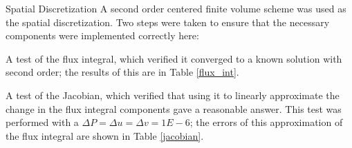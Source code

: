 \documentclass{article}
\begin{document}
\begin{section}{Spatial Discretization}
A second order centered finite volume scheme was used as the spatial discretization.
Two steps were taken to ensure that the necessary components were implemented correctly here:
\begin{itemize}
{\item
  A test of the flux integral, which verified it converged to a known solution with second order;
  the results of this are in Table \ref{flux_int}.
}
{\item
  A test of the Jacobian, which verified that using it to linearly approximate the change in the
  flux integral components gave a reasonable answer.
  This test was performed with a $\Delta P = \Delta u = \Delta v = 1E-6$;
  the errors of this approximation of the flux integral are shown in Table \ref{jacobian}.
}
\end{itemize}

\begin{table}[ht]
\end{table}


\end{section}
\end{document}

